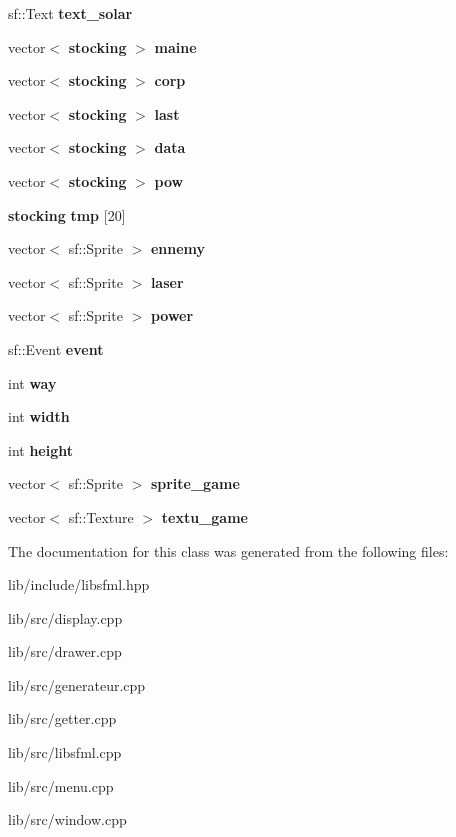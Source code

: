 \begin{DoxyCompactItemize}
sf\+::\+Text {\bfseries text\+\_\+solar}
\item 
\mbox{\label{classlib___s_f_m_l_a5f41388899a22cb76000059e479857b1}} 
vector$<$ \textbf{ stocking} $>$ {\bfseries maine}
\item 
\mbox{\label{classlib___s_f_m_l_aa54860ebe7208b90d54baa7cd90c4f8c}} 
vector$<$ \textbf{ stocking} $>$ {\bfseries corp}
\item 
\mbox{\label{classlib___s_f_m_l_aadde055784a26ffa3568215ca9d9695d}} 
vector$<$ \textbf{ stocking} $>$ {\bfseries last}
\item 
\mbox{\label{classlib___s_f_m_l_a4ac1aa1ea9f1d9f26e4f670ff4d7cee5}} 
vector$<$ \textbf{ stocking} $>$ {\bfseries data}
\item 
\mbox{\label{classlib___s_f_m_l_a1c15cdc966707bc825316d5b167d467c}} 
vector$<$ \textbf{ stocking} $>$ {\bfseries pow}
\item 
\mbox{\label{classlib___s_f_m_l_aa20eee9d5c605bc86a651d7f5d4b9535}} 
\textbf{ stocking} {\bfseries tmp} [20]
\item 
\mbox{\label{classlib___s_f_m_l_a5b39bb40b18845cdbe77a5a74a7ec7cc}} 
vector$<$ sf\+::\+Sprite $>$ {\bfseries ennemy}
\item 
\mbox{\label{classlib___s_f_m_l_a9c6277114ed3abeb3c42ded632328bfd}} 
vector$<$ sf\+::\+Sprite $>$ {\bfseries laser}
\item 
\mbox{\label{classlib___s_f_m_l_aed512c3da6f669cd4be12062351d4ec9}} 
vector$<$ sf\+::\+Sprite $>$ {\bfseries power}
\item 
\mbox{\label{classlib___s_f_m_l_af4b6b3def3a89126bb1a91b270041e85}} 
sf\+::\+Event {\bfseries event}
\item 
\mbox{\label{classlib___s_f_m_l_ac2c536cf9117135be3587f28106af61c}} 
int {\bfseries way}
\item 
\mbox{\label{classlib___s_f_m_l_ac214779b48b8e9a98d7adf439213720d}} 
int {\bfseries width}
\item 
\mbox{\label{classlib___s_f_m_l_a6954a15233f24a9315c3529ad35bec13}} 
int {\bfseries height}
\item 
\mbox{\label{classlib___s_f_m_l_ac5eb266da535c466674280b0492df6f6}} 
vector$<$ sf\+::\+Sprite $>$ {\bfseries sprite\+\_\+game}
\item 
\mbox{\label{classlib___s_f_m_l_a376ae168692c1555132f3c1f05319c5a}} 
vector$<$ sf\+::\+Texture $>$ {\bfseries textu\+\_\+game}
\end{DoxyCompactItemize}


The documentation for this class was generated from the following files\+:\begin{DoxyCompactItemize}
\item 
lib/include/libsfml.\+hpp\item 
lib/src/display.\+cpp\item 
lib/src/drawer.\+cpp\item 
lib/src/generateur.\+cpp\item 
lib/src/getter.\+cpp\item 
lib/src/libsfml.\+cpp\item 
lib/src/menu.\+cpp\item 
lib/src/window.\+cpp\end{DoxyCompactItemize}
